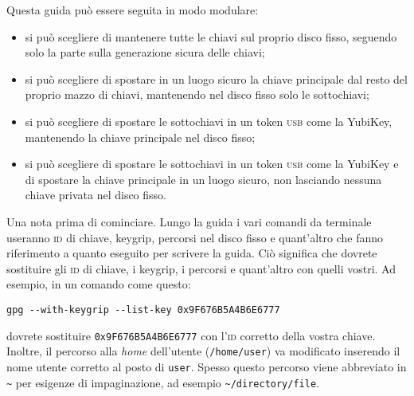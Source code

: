Questa guida può essere seguita in modo modulare:

\begin{itemize}
  \item si può scegliere di mantenere tutte le chiavi sul proprio disco fisso,
  seguendo solo la parte sulla generazione sicura delle chiavi;
  \item si può scegliere di spostare in un luogo sicuro la chiave principale dal
  resto del proprio mazzo di chiavi, mantenendo nel disco fisso solo le
  sottochiavi;
  \item si può scegliere di spostare le sottochiavi in un token \textsc{usb}
  come la YubiKey, mantenendo la chiave principale nel disco fisso;
  \item si può scegliere di spostare le sottochiavi in un token \textsc{usb}
  come la YubiKey e di spostare la chiave principale in un luogo sicuro, non
  lasciando nessuna chiave privata nel disco fisso.
\end{itemize}

Una nota prima di cominciare. Lungo la guida i vari comandi da
terminale useranno \textsc{id} di chiave, keygrip, percorsi nel disco fisso e
quant'altro che fanno riferimento a quanto eseguito per scrivere la guida. Ciò
significa che dovrete sostituire gli \textsc{id} di chiave, i keygrip, i
percorsi e quant'altro con quelli vostri. Ad esempio, in un comando come questo:

\begin{lstlisting}
gpg --with-keygrip --list-key 0x9F676B5A4B6E6777
\end{lstlisting}

\noindent dovrete sostituire \texttt{0x9F676B5A4B6E6777} con l'\textsc{id}
corretto della vostra chiave. Inoltre, il percorso alla \emph{home} dell'utente
(\texttt{/home/user}) va modificato inserendo il nome utente corretto al posto
di \texttt{user}. Spesso questo percorso viene abbreviato in \texttt{\~{}} per
esigenze di impaginazione, ad esempio \texttt{\~{}/directory/file}.
